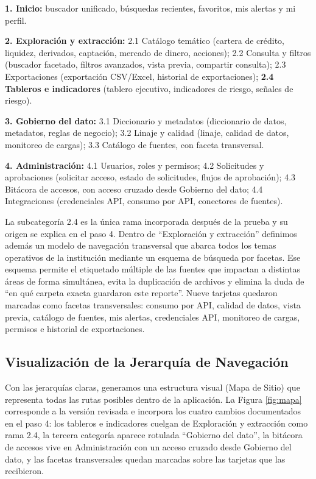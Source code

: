 \begin{uxlist}
  \item \textbf{1. Inicio:} buscador unificado, búsquedas recientes, favoritos, mis alertas y mi perfil.
  \item \textbf{2. Exploración y extracción:} 2.1 Catálogo temático (cartera de crédito, liquidez, derivados, captación, mercado de dinero, acciones); 2.2 Consulta y filtros (buscador facetado, filtros avanzados, vista previa, compartir consulta); 2.3 Exportaciones (exportación CSV/Excel, historial de exportaciones); \textbf{2.4 Tableros e indicadores} (tablero ejecutivo, indicadores de riesgo, señales de riesgo).
  \item \textbf{3. Gobierno del dato:} 3.1 Diccionario y metadatos (diccionario de datos, metadatos, reglas de negocio); 3.2 Linaje y calidad (linaje, calidad de datos, monitoreo de cargas); 3.3 Catálogo de fuentes, con faceta transversal.
  \item \textbf{4. Administración:} 4.1 Usuarios, roles y permisos; 4.2 Solicitudes y aprobaciones (solicitar acceso, estado de solicitudes, flujos de aprobación); 4.3 Bitácora de accesos, con acceso cruzado desde Gobierno del dato; 4.4 Integraciones (credenciales API, consumo por API, conectores de fuentes).
\end{uxlist}

La subcategoría 2.4 es la única rama incorporada después de la prueba y su origen se explica en el paso 4. Dentro de ``Exploración y extracción'' definimos además un modelo de navegación transversal que abarca todos los temas operativos de la institución mediante un esquema de búsqueda por facetas. Ese esquema permite el etiquetado múltiple de las fuentes que impactan a distintas áreas de forma simultánea, evita la duplicación de archivos y elimina la duda de ``en qué carpeta exacta guardaron este reporte''. Nueve tarjetas quedaron marcadas como facetas transversales: consumo por API, calidad de datos, vista previa, catálogo de fuentes, mis alertas, credenciales API, monitoreo de cargas, permisos e historial de exportaciones.

\subsection{Visualización de la Jerarquía de Navegación}
Con las jerarquías claras, generamos una estructura visual (Mapa de Sitio) que representa todas las rutas posibles dentro de la aplicación. La Figura \ref{fig:mapa} corresponde a la versión revisada e incorpora los cuatro cambios documentados en el paso 4: los tableros e indicadores cuelgan de Exploración y extracción como rama 2.4, la tercera categoría aparece rotulada ``Gobierno del dato'', la bitácora de accesos vive en Administración con un acceso cruzado desde Gobierno del dato, y las facetas transversales quedan marcadas sobre las tarjetas que las recibieron.


